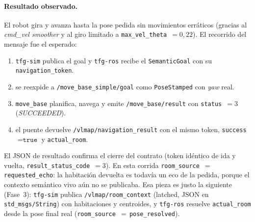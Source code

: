 \documentclass[11pt,a4paper]{article}
\begin{document}
\paragraph{Resultado observado.} El robot gira y avanza hasta la pose pedida
sin movimientos erráticos (gracias al \emph{cmd\_vel smoother} y al giro
limitado a \texttt{max\_vel\_theta}~$=0{,}22$). El recorrido del mensaje fue
el esperado:
\begin{enumerate}[noitemsep]
  \item \texttt{tfg-sim} publica el goal y \texttt{tfg-ros} recibe el
        \texttt{SemanticGoal} con su \texttt{navigation\_token}.
  \item se reexpide a \texttt{/move\_base\_simple/goal} como
        \texttt{PoseStamped} con \emph{yaw} real.
  \item \texttt{move\_base} planifica, navega y emite
        \texttt{/move\_base/result} con \texttt{status}~$=3$ (\emph{SUCCEEDED}).
  \item el puente devuelve \texttt{/vlmap/navigation\_result} con el mismo
        token, \texttt{success}~$=\texttt{true}$ y \texttt{actual\_room}.
\end{enumerate}

El JSON de resultado confirma el cierre del contrato (token idéntico de ida y
vuelta, \texttt{result\_status\_code}~$=3$). En esta corrida
\texttt{room\_source}~$=$\,\texttt{requested\_echo}: la habitación devuelta es
todavía un eco de la pedida, porque el contexto semántico vivo aún no se
publicaba. Esa pieza es justo la siguiente (Fase~3): \texttt{tfg-sim} publica
\texttt{/vlmap/room\_context} (latched, JSON en \texttt{std\_msgs/String}) con
habitaciones y centroides, y \texttt{tfg-ros} resuelve \texttt{actual\_room}
desde la pose final real (\texttt{room\_source}~$=$\,\texttt{pose\_resolved}).
\end{document}
